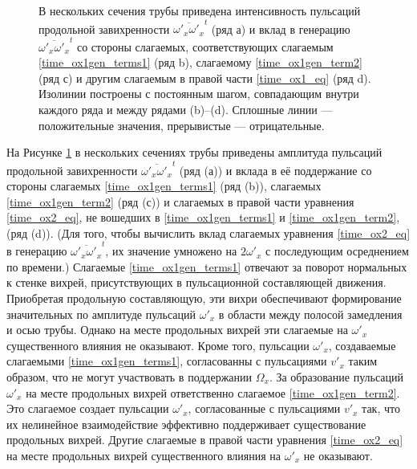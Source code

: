 \begin{figure}[h!]
\caption{В нескольких сечения трубы приведена интенсивность пульсаций продольной завихренности $\overline{\omega'_x \omega'_x}^t$ (ряд а) и вклад в генерацию $\overline{\omega'_x \omega'_x}^t$ со стороны слагаемых, соответствующих слагаемым \eqref{time_ox1gen_terms1} (ряд b), слагаемому \eqref{time_ox1gen_term2} (ряд с) и другим слагаемым в правой части \eqref{time_ox1_eq} (ряд d). Изолинии построены с постоянным шагом, совпадающим внутри каждого ряда и между рядами (b)--(d). Сплошные линии --- положительные значения, прерывистые --- отрицательные.}
\label{mp_ox1gen_pic}
\end{figure}


На Рисунке \ref{mp_ox1gen_pic} в нескольких сечениях трубы приведены амплитуда пульсаций продольной завихренности $\overline{\omega'_x \omega'_x}^t$ (ряд (а)) и вклада в её поддержание со стороны слагаемых \eqref{time_ox1gen_terms1} (ряд (b)), слагаемых \eqref{time_ox1gen_term2} (ряд (с)) и слагаемых в правой части уравнения \eqref{time_ox2_eq}, не вошедших в \eqref{time_ox1gen_terms1} и \eqref{time_ox1gen_term2}, (ряд (d)). (Для того, чтобы вычислить вклад слагаемых уравнения \eqref{time_ox2_eq} в генерацию $\overline{\omega'_x \omega'_x}^t$, их значение умножено на $2\omega'_x$ с последующим осреднением по времени.) Слагаемые \eqref{time_ox1gen_terms1} отвечают за поворот нормальных к стенке вихрей, присутствующих в пульсационной составляющей движения. Приобретая продольную составляющую, эти вихри обеспечивают формирование значительных по амплитуде пульсаций $\omega'_x$ в области между полосой замедления и осью трубы. Однако на месте продольных вихрей эти слагаемые на $\omega'_x$ существенного влияния не оказывают. Кроме того, пульсации $\omega'_x$, создаваемые слагаемыми \eqref{time_ox1gen_terms1}, согласованны с пульсациями $v'_x$ таким образом, что не могут участвовать в поддержании $\Omega_x$. За образование пульсаций $\omega'_x$ на месте продольных вихрей ответственно слагаемое \eqref{time_ox1gen_term2}. Это слагаемое создает пульсации $\omega'_x$, согласованные с пульсациями $v'_x$ так, что их нелинейное взаимодействие эффективно поддерживает существование продольных вихрей. Другие слагаемые в правой части уравнения \eqref{time_ox2_eq} на месте продольных вихрей существенного влияния на $\omega'_x$ не оказывают. 


